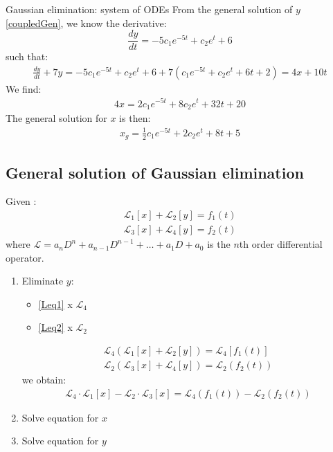 \begin{exmp}{Gaussian elimination: system of ODEs}
From the general solution of $y$ \eqref{coupledGen}, we know the derivative:
\begin{equation*}
\frac{dy}{dt} =-5c_1e^{-5t}+c_2 e^t+6 
\end{equation*}
such that:
\begin{align*}
\frac{dy}{dt}+7y =-5c_1e^{-5t}+c_2 e^t+6 +7(c_1e^{-5t}+c_2e^t+6t+2)=4x +10 t
\end{align*}
We find:
\begin{align*}
4x=2c_1e^{-5t}+8c_2 e^t +32t+20
\end{align*}
The general solution for $x$ is then:
\begin{align*}
\boxed{x_g=\frac{1}{2}c_1e^{-5t}+2c_2 e^t +8t+5}
\end{align*}
\end{exmp}


\subsection{General solution of Gaussian elimination}
Given :
\begin{align}
\mathcal{L}_1[x]+\mathcal{L}_2[y]=f_1(t) \label{Leq1}\\
\mathcal{L}_3[x]+\mathcal{L}_4[y]=f_2(t)\label{Leq2}
\end{align}
where $\mathcal{L}=a_nD^n+a_{n-1}D^{n-1}+\hdots+a_1D+a_0$ is the $n$th order differential operator.

\begin{enumerate}
\item Eliminate $y$: 
\begin{itemize}
\item \eqref{Leq1} x $\mathcal{L}_4$
\item \eqref{Leq2} x $\mathcal{L}_2$
\end{itemize}
\begin{align*}
\mathcal{L}_4\left(\mathcal{L}_1[x]+\mathcal{L}_2[y]\right)=\mathcal{L}_4[f_1(t)]\\
\mathcal{L}_2\left(\mathcal{L}_3[x]+\mathcal{L}_4[y]\right)=\mathcal{L}_2(f_2(t))
\end{align*}
we obtain:
\begin{align*}
\boxed{\mathcal{L}_4\cdot \mathcal{L}_1[x]-\mathcal{L}_2\cdot \mathcal{L}_3 [x]=\mathcal{L}_4(f_1(t))-\mathcal{L}_2(f_2(t))}
\end{align*}
\item Solve equation for $x$
\item Solve equation for $y$

\end{enumerate}


